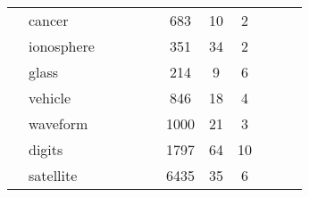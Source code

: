 \begin{tabular}{l l C{0.6\tblw} C{0.6\tblw} C{0.6\tblw} C{0.6\tblw} C{0.6\tblw}  C{0.6\tblw}  C{0.6\tblw} C{0.6\tblw}  C{0.6\tblw}  C{0.6\tblw}}
& \sc cancer &  &  &  &  & 683 & 10 & 2 \\
& \sc ionosphere &  &  &  &  & 351 & 34 & 2 \\
& \sc glass &  &  &  &  & 214 & 9 & 6 \\
& \sc vehicle &  &  &  &  & 846 & 18 & 4 \\
& \sc waveform &  &  &  &  & 1000 & 21 & 3 \\
& \sc digits &  &  &  &  & 1797 & 64 & 10 \\
& \sc satellite &  &  &  &  & 6435 & 35 & 6 \\
\midrule
\bottomrule
\end{tabular}
